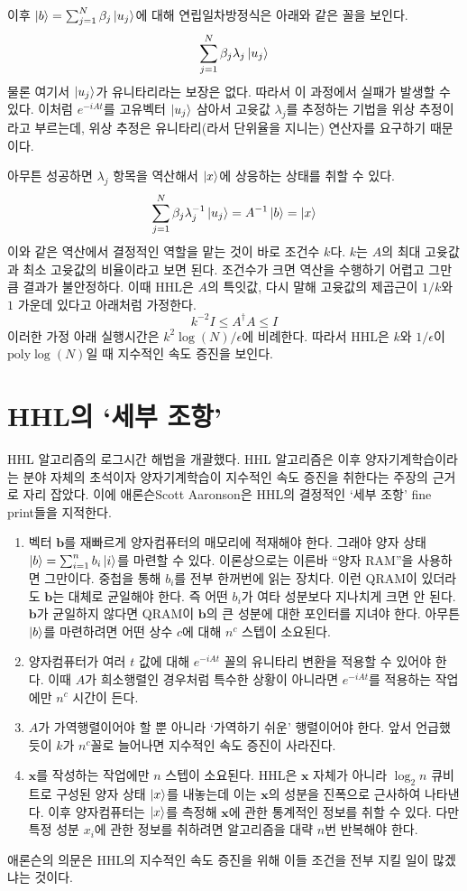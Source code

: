 \documentclass[a4paper,atbegshi,chapter,itemph,hidelinks]{oblivoir}
\begin{document}
이후 $\ket{b}=\sum_{j=1}^N\beta_j\ket{u_j}$에 대해 연립일차방정식은 아래와
같은 꼴을 보인다.
\[
  \sum_{j=1}^N\beta_j\lambda_j\ket{u_j}
\]
물론 여기서 $\ket{u_j}$가 유니타리라는 보장은 없다. 따라서 이 과정에서 실패가
발생할 수 있다. 이처럼 $e^{-iAt}$를 고유벡터 $\ket{u_j}$ 삼아서 고윳값
$\lambda_j$를 추정하는 기법을 위상 추정이라고 부르는데, 위상 추정은 유니타리(라서
단위율을 지니는) 연산자를 요구하기 때문이다. 

아무튼 성공하면 $\lambda_j$ 항목을 역산해서 $\ket{x}$에 상응하는
상태를 취할 수 있다.
\[
  \sum_{j=1}^N\beta_j\lambda_j^{-1}\ket{u_j}=A^{-1}\ket{b}=\ket{x}
\]
이와 같은 역산에서 결정적인 역할을 맡는 것이 바로 조건수 $k$다. $k$는 $A$의 최대
고윳값과 최소 고윳값의 비율이라고 보면 된다. 조건수가 크면 역산을 수행하기
어렵고 그만큼 결과가 불안정하다. 이때 HHL은 $A$의 특잇값, 다시 말해 고윳값의
제곱근이 $1/k$와 $1$ 가운데 있다고 아래처럼 가정한다.
\[
  k^{-2}I\leq A^{\dagger}A \leq I
\]
이러한 가정 아래 실행시간은 $k^2\log(N)/\epsilon$에 비례한다. 따라서 HHL은
$k$와 $1/\epsilon$이 $\textrm{poly}\log(N)$일 때 지수적인 속도 증진을 보인다.
\section{HHL의 `세부 조항'}
HHL 알고리즘의 로그시간 해법을 개괄했다. HHL 알고리즘은 이후 양자기계학습이라는
분야 자체의 초석이자 양자기계학습이 지수적인 속도 증진을 취한다는 주장의 근거로
자리 잡았다. 이에 애론슨{\tiny Scott Aaronson}은 HHL의 결정적인 `세부 조항'{\tiny
fine print}들을 지적한다.
\hfill\break
\begin{enumerate}[label=(\alph*)]
  \item 벡터 $\pmb{b}$를 재빠르게 양자컴퓨터의 매모리에 적재해야 한다. 그래야
    양자 상태 $\ket{b}=\sum_{i=1}^n b_i\ket{i}$를 마련할 수 있다. 이론상으로는
    이른바  ``양자 RAM''을 사용하면 그만이다. 중첩을 통해 $b_i$를 전부 한꺼번에
    읽는 장치다. 이런 QRAM이 있더라도 $\pmb{b}$는 대체로 균일해야 한다. 즉
    어떤 $b_i$가 여타 성분보다 지나치게 크면 안 된다. $\pmb{b}$가 균일하지
    않다면 QRAM이 $\pmb{b}$의 큰 성분에 대한 포인터를 지녀야 한다. 아무튼
    $\ket{b}$를 마련하려면 어떤 상수 $c$에 대해 $n^c$ 스텝이 소요된다.
  \item 양자컴퓨터가 여러 $t$ 값에 대해 $e^{-iAt}$ 꼴의 유니타리 변환을 적용할
    수 있어야 한다. 이때 $A$가 희소행렬인 경우처럼 특수한 상황이 아니라면
    $e^{-iAt}$를 적용하는 작업에만 $n^c$ 시간이 든다.
  \item $A$가 가역행렬이어야 할 뿐 아니라 `가역하기 쉬운' 행렬이어야 한다.
    앞서 언급했듯이 $k$가 $n^c$꼴로 늘어나면 지수적인 속도 증진이 사라진다.
  \item $\pmb{x}$를 작성하는 작업에만 $n$ 스텝이 소요된다.
    HHL은 $\pmb{x}$ 자체가 아니라 $\log_2n$ 큐비트로 구성된 양자 상태 $\ket{x}$를
    내놓는데 이는 $\pmb{x}$의 성분을 진폭으로 근사하여 나타낸다. 이후
    양자컴퓨터는 $\ket{x}$를 측정해 $\pmb{x}$에 관한 통계적인 정보를 취할 수 있다.
    다만 특정 성분 $x_i$에 관한 정보를 취하려면 알고리즘을 대략 $n$번 반복해야
    한다.
\end{enumerate}
\hfill\break
애론슨의 의문은 HHL의 지수적인 속도 증진을 위해 이들 조건을 전부 지킬 일이
많겠냐는 것이다. 
\end{document}

